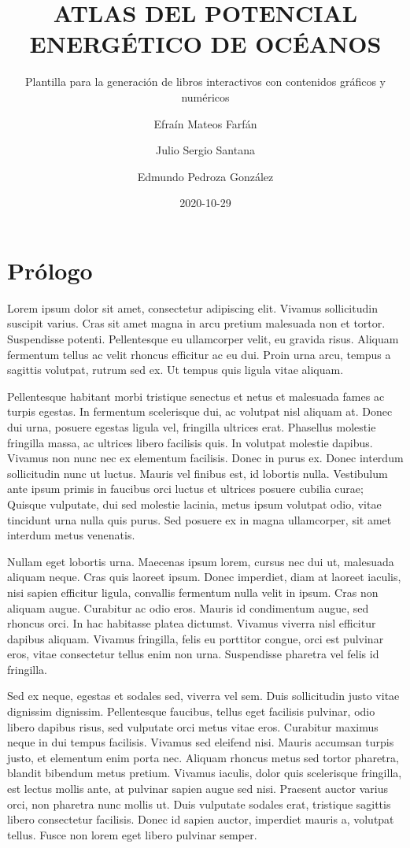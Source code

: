 \documentclass[
]{article}
\title{ATLAS DEL POTENCIAL ENERGÉTICO DE OCÉANOS}
\subtitle{Plantilla para la generación de libros interactivos con contenidos gráficos y numéricos}
\author{Efraín Mateos Farfán \and Julio Sergio Santana \and Edmundo Pedroza González}
\date{2020-10-29}
\begin{document}
\maketitle

{
\setcounter{tocdepth}{2}
\tableofcontents
}
\hypertarget{pruxf3logo}{%
\section{Prólogo}\label{pruxf3logo}}

Lorem ipsum dolor sit amet, consectetur adipiscing elit. Vivamus sollicitudin suscipit varius. Cras sit amet magna in arcu pretium malesuada non et tortor. Suspendisse potenti. Pellentesque eu ullamcorper velit, eu gravida risus. Aliquam fermentum tellus ac velit rhoncus efficitur ac eu dui. Proin urna arcu, tempus a sagittis volutpat, rutrum sed ex. Ut tempus quis ligula vitae aliquam.

Pellentesque habitant morbi tristique senectus et netus et malesuada fames ac turpis egestas. In fermentum scelerisque dui, ac volutpat nisl aliquam at. Donec dui urna, posuere egestas ligula vel, fringilla ultrices erat. Phasellus molestie fringilla massa, ac ultrices libero facilisis quis. In volutpat molestie dapibus. Vivamus non nunc nec ex elementum facilisis. Donec in purus ex. Donec interdum sollicitudin nunc ut luctus. Mauris vel finibus est, id lobortis nulla. Vestibulum ante ipsum primis in faucibus orci luctus et ultrices posuere cubilia curae; Quisque vulputate, dui sed molestie lacinia, metus ipsum volutpat odio, vitae tincidunt urna nulla quis purus. Sed posuere ex in magna ullamcorper, sit amet interdum metus venenatis.

Nullam eget lobortis urna. Maecenas ipsum lorem, cursus nec dui ut, malesuada aliquam neque. Cras quis laoreet ipsum. Donec imperdiet, diam at laoreet iaculis, nisi sapien efficitur ligula, convallis fermentum nulla velit in ipsum. Cras non aliquam augue. Curabitur ac odio eros. Mauris id condimentum augue, sed rhoncus orci. In hac habitasse platea dictumst. Vivamus viverra nisl efficitur dapibus aliquam. Vivamus fringilla, felis eu porttitor congue, orci est pulvinar eros, vitae consectetur tellus enim non urna. Suspendisse pharetra vel felis id fringilla.

Sed ex neque, egestas et sodales sed, viverra vel sem. Duis sollicitudin justo vitae dignissim dignissim. Pellentesque faucibus, tellus eget facilisis pulvinar, odio libero dapibus risus, sed vulputate orci metus vitae eros. Curabitur maximus neque in dui tempus facilisis. Vivamus sed eleifend nisi. Mauris accumsan turpis justo, et elementum enim porta nec. Aliquam rhoncus metus sed tortor pharetra, blandit bibendum metus pretium. Vivamus iaculis, dolor quis scelerisque fringilla, est lectus mollis ante, at pulvinar sapien augue sed nisi. Praesent auctor varius orci, non pharetra nunc mollis ut. Duis vulputate sodales erat, tristique sagittis libero consectetur facilisis. Donec id sapien auctor, imperdiet mauris a, volutpat tellus. Fusce non lorem eget libero pulvinar semper.
\end{document}
